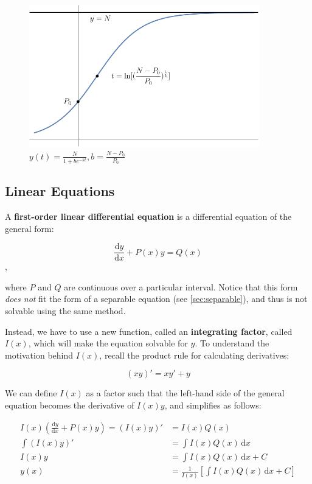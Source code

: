 \documentclass[12pt]{article}
\begin{document}
\begin{itemize}
    \begin{figure}[!ht]
        \centering
        \includegraphics[width=10cm]{misc/logisticmodel.png}
        \caption{$y(t) = \frac{N}{1+be^{-kt}}, b = \frac{N-P_0}{P_0}$}
        \label{fig:logisticmodel}
    \end{figure}
\end{itemize}

\subsection{Linear Equations}

A \textbf{first-order linear differential equation} is a differential equation of the general form:

$$\frac{\text{d}y}{\text{d}x} + P(x)y = Q(x)$$,

where $P$ and $Q$ are continuous over a particular interval. Notice that this form \textit{does not} fit the form of a separable equation (see \ref{sec:separable}), and thus is not solvable using the same method.

Instead, we have to use a new function, called an \textbf{integrating factor}, called $I(x)$, which will make the equation solvable for $y$. To understand the motivation behind $I(x)$, recall the product rule for calculating derivatives:

$$(xy)' = xy'+y$$

We can define $I(x)$ as a factor such that the left-hand side of the general equation becomes the derivative of $I(x)y$, and simplifies as follows:

\begin{equation}
    \begin{split}
    I(x)(\frac{\text{d}y}{\text{d}x} + P(x)y) = (I(x)y)' &= I(x)Q(x)\\
    \int (I(x)y)' &= \int I(x)Q(x)\,\text{d}x\\
    I(x)y &=  \int I(x)Q(x) \,\text{d}x + C\\
    y(x) &= \frac{1}{I(x)}[\int I(x)Q(x) \,\text{d}x + C]\\
    \end{split}
\end{equation}
\end{document}
